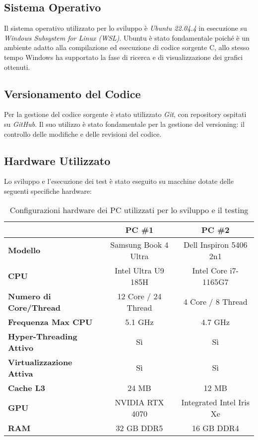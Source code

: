 \subsection{Sistema Operativo}
Il sistema operativo utilizzato per lo sviluppo è \textit{Ubuntu 22.04.4} in esecuzione su \textit{Windows Subsystem for Linux (WSL)}. Ubuntu è stato fondamentale poiché è un ambiente adatto alla compilazione ed esecuzione di codice sorgente C, allo stesso tempo Windows ha supportato la fase di ricerca e di visualizzazione dei grafici ottenuti.

\subsection{Versionamento del Codice}
Per la gestione del codice sorgente è stato utilizzato \textit{Git}, con repository ospitati su \textit{GitHub}. Il suo utilizzo è stato fondamentale per la gestione del versioning: il controllo delle modifiche e delle revisioni del codice.

\subsection{Hardware Utilizzato}
Lo sviluppo e l'esecuzione dei test è stato eseguito su macchine dotate delle seguenti specifiche hardware:
\begin{table}[H]
\centering
\begin{tabular}{|l|c|c|}
\hline
 & \textbf{PC \#1} & \textbf{PC \#2} \\ \hline
\textbf{Modello} & Samsung Book 4 Ultra & Dell Inspiron 5406 2n1 \\ \hline
\textbf{CPU} & Intel Ultra U9 185H & Intel Core i7-1165G7 \\ \hline
\textbf{Numero di Core/Thread} & 12 Core / 24 Thread & 4 Core / 8 Thread \\ \hline
\textbf{Frequenza Max CPU} & 5.1 GHz & 4.7 GHz \\ \hline
\textbf{Hyper-Threading Attivo} & Sì & Sì \\ \hline
\textbf{Virtualizzazione Attiva} & Sì & Sì \\ \hline
\textbf{Cache L3} & 24 MB & 12 MB \\ \hline
\textbf{GPU} & NVIDIA RTX 4070 & Integrated Intel Iris Xe \\ \hline
\textbf{RAM} & 32 GB DDR5 & 16 GB DDR4 \\ \hline
\end{tabular}
\caption{Configurazioni hardware dei PC utilizzati per lo sviluppo e il testing}
\label{tab:hardware}
\end{table}

